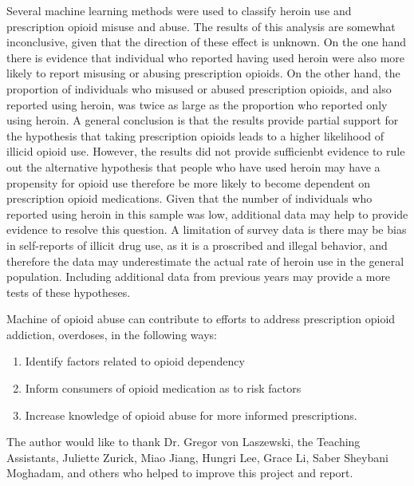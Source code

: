 \documentclass[sigconf]{acmart}
\begin{document}
Several machine learning methods were used to classify heroin use and 
prescription opioid misuse and abuse. The results of this analysis are somewhat inconclusive, given that the direction of these effect is unknown. On the one 
hand there is evidence that individual who reported having used heroin were 
also more likely to report misusing or abusing prescription opioids. On the 
other hand, the proportion of individuals who misused or abused prescription 
opioids, and also reported using heroin, was twice as large as the proportion 
who reported only using heroin. A general conclusion is that the results 
provide partial support for the hypothesis that taking prescription opioids
leads to a higher likelihood of illicid opioid use. However, the results did
not provide sufficienbt evidence to rule out the alternative hypothesis that
people who have used heroin may have a propensity for opioid use therefore
be more likely to become dependent on prescription opioid medications. Given
that the number of individuals who reported using heroin in this sample was
low, additional data may help to provide evidence to resolve this question.
A limitation of survey data is there may be bias in self-reports of illicit
drug use, as it is a proscribed and illegal behavior, and therefore the 
data may underestimate the actual rate of heroin use in the general population. 
Including additional data from previous years may provide a more tests of 
these hypotheses. 


Machine of opioid abuse can contribute to efforts to 
address prescription opioid addiction, overdoses, in the following ways: 
\begin{enumerate}
\item Identify factors related to opioid dependency
\item Inform consumers of opioid medication as to risk factors 
\item Increase knowledge of opioid abuse for more informed prescriptions. 
\end{enumerate}



\begin{acks}

The author would like to thank Dr. Gregor von Laszewski, the Teaching 
Assistants, Juliette Zurick, Miao Jiang, Hungri Lee, Grace Li, Saber Sheybani
Moghadam, and others who helped to improve this project and report.

\end{acks}
\end{document}
